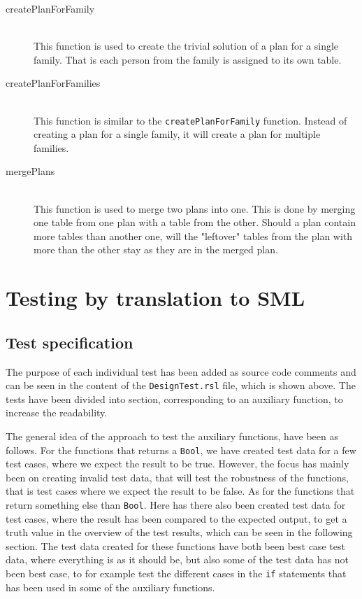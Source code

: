 \documentclass[a4]{article}
\begin{document}
\begin{description}
  \item[createPlanForFamily] \hfill \\ This function is used to create the trivial solution of a plan for a single family. That is each person from the family is assigned to its own table.
  \item[createPlanForFamilies] \hfill \\ This function is similar to the \verb=createPlanForFamily= function. Instead of creating a plan for a single family, it will create a plan for multiple families.
  \item[mergePlans] \hfill \\ This function is used to merge two plans into one. This is done by merging one table from one plan with a table from the other. Should a plan contain more tables than another one, will the "leftover" tables from the plan with more than the other stay as they are in the merged plan.
\end{description}

\section{Testing by translation to SML}

\subsection{Test specification}



The purpose of each individual test has been added as source code comments and can be seen in the content of the \verb=DesignTest.rsl= file, which is shown above. The tests have been divided into section, corresponding to an auxiliary function, to increase the readability.

The general idea of the approach to test the auxiliary functions, have been as follows. For the functions that returns a \verb=Bool=, we have created test data for a few test cases, where we expect the result to be true. However, the focus has mainly been on creating invalid test data, that will test the robustness of the functions, that is test cases where we expect the result to be false. As for the functions that return something else than \verb=Bool=. Here has there also been created test data for test cases, where the result has been compared to the expected output, to get a truth value in the overview of the test results, which can be seen in the following section. The test data created for these functions have both been best case test data, where everything is as it should be, but also some of the test data has not been best case, to for example test the different cases in the \verb=if= statements that has been used in some of the auxiliary functions.
\end{document}
